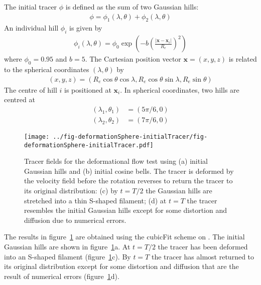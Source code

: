The initial tracer $\phi$ is defined as the sum of two Gaussian hills:
\begin{align}
	\phi = \phi_1(\lambda, \theta) + \phi_2(\lambda, \theta)
\end{align}
An individual hill $\phi_i$ is given by
\begin{align}
	\phi_i(\lambda, \theta) = \phi_0 \exp\left( -b \left( \frac{|\mathbf{x} - \mathbf{x}_i|}{R_e} \right)^2 \right)
\end{align}
where $\phi_0 = 0.95$ and $b = 5$.  The Cartesian position vector $\mathbf{x} = (x,y,z)$ is related to the spherical coordinates $(\lambda, \theta)$ by
\begin{align}
	(x,y,z) = (R_e \cos \theta \cos \lambda, R_e \cos \theta \sin \lambda, R_e \sin \theta)
\end{align}
The centre of hill $i$ is positioned at $\mathbf{x}_i$.  In spherical coordinates, two hills are centred at
\begin{align}
	(\lambda_1,\theta_1) &= (5 \pi /6, 0) \\
	(\lambda_2,\theta_2) &= (7 \pi /6, 0)
\end{align}

\begin{figure}
	\centering
	\texttt{[image: ../fig-deformationSphere-initialTracer/fig-deformationSphere-initialTracer.pdf]}
	\caption{Tracer fields for the deformational flow test using (a) initial Gaussian hills and (b) initial cosine bells.  The tracer is deformed by the velocity field before the rotation reverses to return the tracer to its original distribution: (c) by $t=T/2$ the Gaussian hills are stretched into a thin S-shaped filament; (d) at $t=T$ the tracer resembles the initial Gaussian hills except for some distortion and diffusion due to numerical errors.
	\\
	}
	\label{fig:deformationSphere-evolution}
\end{figure}

The results in figure~\ref{fig:deformationSphere-evolution} are obtained using the cubicFit scheme on .  The initial Gaussian hills are shown in figure~\ref{fig:deformationSphere-evolution}a.  At $t=T/2$ the tracer has been deformed into an S-shaped filament (figure~\ref{fig:deformationSphere-evolution}c).  By $t=T$ the tracer has almost returned to its original distribution except for some distortion and diffusion that are the result of numerical errors (figure~\ref{fig:deformationSphere-evolution}d).

